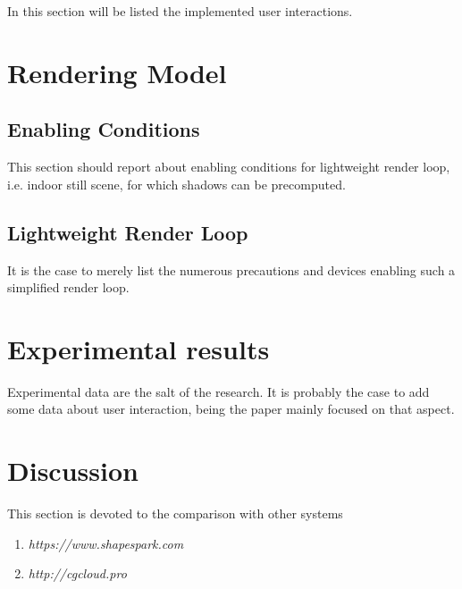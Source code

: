 \documentclass{sigchi}
\begin{document}
In this section will be listed the implemented user interactions.



\section{Rendering Model} %
\label{sec:rendering_model}

\subsection{Enabling Conditions} %
\label{sub:enabling_conditions}

This section should report about enabling conditions for lightweight render loop, i.e. indoor still scene, for which shadows can be precomputed.


\subsection{Lightweight Render Loop} %
\label{sub:lightweight_render_loop}

It is the case to merely list the numerous precautions and devices enabling such a simplified render loop.




\section{Experimental results} %
\label{sec:experimental_results}

Experimental data are the salt of the research. It is probably the case to add some data about user interaction, being the paper mainly focused on that aspect.



\section{Discussion}  %
\label{sec:discussion}

This section is devoted to the comparison with other systems 

\begin{enumerate}
  \item \em{https://www.shapespark.com}
  \item \em{http://cgcloud.pro}
\end{enumerate}
\end{document}
